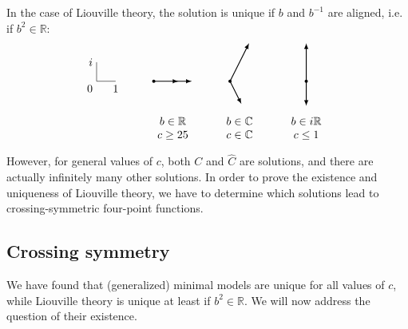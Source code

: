 \documentclass[12pt, a4paper]{article}
\theoremstyle{break}
\begin{document}
In the case of Liouville theory, the solution is unique if $b$ and $b^{-1}$ are aligned, i.e. if $b^2\in\mathbb{R}$:
\begin{equation}
 \begin{tikzpicture}[baseline=(current  bounding  box.center), scale = .6]
\draw (0, 2) node[left]{$i$} -- (0, 1) node[below left] {$0$} -- (1, 1) node[below] {$1$};
\draw [thick, latex-latex] (11,3) -- (11,1) node[fill, circle, minimum size = 1mm, inner sep = 0]{} -- (11,-.3);
\draw [thick, latex-latex] (8,3) -- (7,1) node[fill, circle, minimum size = 1mm, inner sep = 0]{}-- (7.6,-.2);
\draw [thick, latex-latex] (5,1) -- (3,1) node[fill, circle, minimum size = 1mm, inner sep = 0]{} -- (4.3,1) ;
\node at (4, -1.5){$\begin{array}{c} b\in \mathbb{R} \\ c\geq 25 \end{array}$};
\node at (7.5, -1.5){$\begin{array}{c} b\in \mathbb{C} \\ c\in\mathbb{C} \end{array}$};
\node at (11, -1.5){$\begin{array}{c} b\in i\mathbb{R} \\ c\leq 1 \end{array}$};
 \end{tikzpicture}
\end{equation}
However, for general values of $c$, both $C$ and $\hat C$ are solutions, and there are actually infinitely many other solutions. In order to prove the existence and uniqueness of Liouville theory, we have to determine which solutions lead to crossing-symmetric four-point functions.


\subsection{Crossing symmetry}

We have found that (generalized) minimal models are unique for all values of $c$, while Liouville theory is unique at least if $b^2\in\mathbb{R}$. We will now address the question of their existence. 
\end{document}
